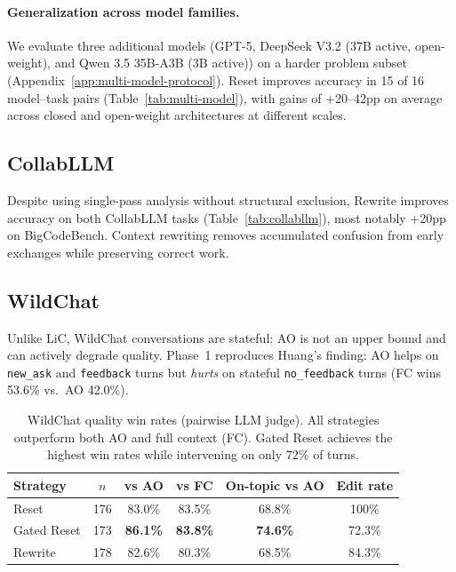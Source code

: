 \documentclass{article} %
\begin{document}
\paragraph{Generalization across model families.}
\label{sec:multi-model}
We evaluate three additional models (GPT-5, DeepSeek V3.2 (37B active, open-weight), and Qwen 3.5 35B-A3B (3B active)) on a harder problem subset (Appendix~\ref{app:multi-model-protocol}). Reset improves accuracy in 15 of 16 model--task pairs (Table~\ref{tab:multi-model}), with gains of +20--42pp on average across closed and open-weight architectures at different scales.


\subsection{CollabLLM}
\label{sec:collab-results}

Despite using single-pass analysis without structural exclusion, Rewrite improves accuracy on both CollabLLM tasks (Table~\ref{tab:collabllm}), most notably +20pp on BigCodeBench. Context rewriting removes accumulated confusion from early exchanges while preserving correct work.


\subsection{WildChat}
\label{sec:wildchat-results}

Unlike LiC, WildChat conversations are stateful: AO is not an upper bound and can actively degrade quality. Phase~1 reproduces Huang's finding: AO helps on \texttt{new\_ask} and \texttt{feedback} turns but \emph{hurts} on stateful \texttt{no\_feedback} turns (FC wins 53.6\% vs.\ AO 42.0\%).

\begin{table}[t]
\centering
\begin{tabular}{lccccc}
\toprule
\textbf{Strategy} & $n$ & \textbf{vs AO} & \textbf{vs FC} & \textbf{On-topic vs AO} & \textbf{Edit rate} \\
\midrule
Reset & 176 & 83.0\% & 83.5\% & 68.8\% & 100\% \\
Gated Reset & 173 & \textbf{86.1\%} & \textbf{83.8\%} & \textbf{74.6\%} & 72.3\% \\
Rewrite & 178 & 82.6\% & 80.3\% & 68.5\% & 84.3\% \\
\bottomrule
\end{tabular}
\caption{WildChat quality win rates (pairwise LLM judge). All strategies outperform both AO and full context (FC). Gated Reset achieves the highest win rates while intervening on only 72\% of turns.}
\label{tab:wildchat-quality}
\end{table}
\end{document}
